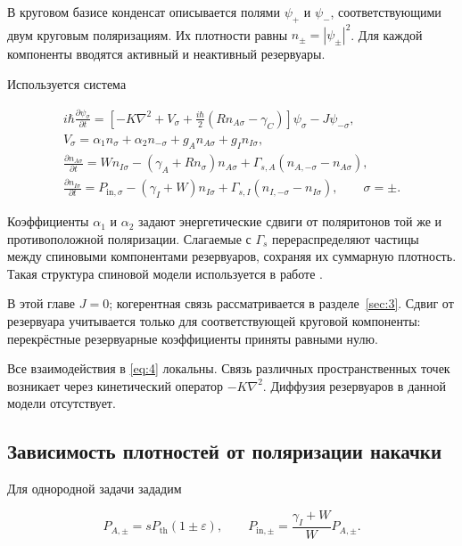 \documentclass[12pt,a4paper]{article}
\begin{document}
В круговом базисе конденсат описывается полями \(\psi_+\) и \(\psi_-\), соответствующими двум круговым поляризациям. Их плотности равны \(n_\pm=|\psi_\pm|^2\). Для каждой компоненты вводятся активный и неактивный резервуары.

Используется система

\begin{equation}\label{eq:4}
\begin{gathered}
i\hbar\frac{\partial\psi_\sigma}{\partial t}
=
\left[
-K\nabla^2+V_\sigma
+\frac{i\hbar}{2}(Rn_{A\sigma}-\gamma_C)
\right]\psi_\sigma
-J\psi_{-\sigma},\\[0.5em]
V_\sigma
=
\alpha_1 n_\sigma+\alpha_2 n_{-\sigma}
+g_A n_{A\sigma}+g_I n_{I\sigma},\\[0.5em]
\frac{\partial n_{A\sigma}}{\partial t}
=
Wn_{I\sigma}
-(\gamma_A+Rn_\sigma)n_{A\sigma}
+\Gamma_{s,A}(n_{A,-\sigma}-n_{A\sigma}),\\[0.5em]
\frac{\partial n_{I\sigma}}{\partial t}
=
P_{\mathrm{in},\sigma}
-(\gamma_I+W)n_{I\sigma}
+\Gamma_{s,I}(n_{I,-\sigma}-n_{I\sigma}),
\qquad \sigma=\pm.
\end{gathered}
\end{equation}

Коэффициенты \(\alpha_1\) и \(\alpha_2\) задают энергетические сдвиги от поляритонов той же и противоположной поляризации. Слагаемые с \(\Gamma_s\) перераспределяют частицы между спиновыми компонентами резервуаров, сохраняя их суммарную плотность. Такая структура спиновой модели используется в работе \cite{ref3}.

В этой главе \(J=0\); когерентная связь рассматривается в разделе~\ref{sec:3}. Сдвиг от резервуара учитывается только для соответствующей круговой компоненты: перекрёстные резервуарные коэффициенты приняты равными нулю.

Все взаимодействия в \eqref{eq:4} локальны. Связь различных пространственных точек возникает через кинетический оператор \(-K\nabla^2\). Диффузия резервуаров в данной модели отсутствует.

\subsection{Зависимость плотностей от поляризации накачки}\label{sec:2.2}

Для однородной задачи зададим

\begin{equation}\label{eq:5}
P_{A,\pm}=sP_{\mathrm{th}}(1\pm\varepsilon),
\qquad
P_{\mathrm{in},\pm}
=
\frac{\gamma_I+W}{W}P_{A,\pm}.
\end{equation}
\end{document}
